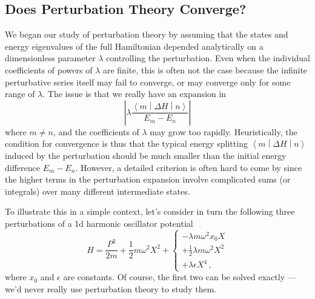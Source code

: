 \documentclass{article}
\theoremstyle{plain}\theoremheaderfont{\normalfont\itshape}\theorembodyfont{\rmfamily}\theoremseparator{.}\newtheorem*{rem}{Remark}\newtheorem*{ex}{Example}\newtheorem*{proof}{Proof}\newtheorem*{altp}{Alternative proof}
\theoremstyle{plain}\theoremheaderfont{\normalfont\bfseries}\theorembodyfont{\rmfamily}\theoremseparator{.}\newtheorem{thm}{Theorem}[section]\newtheorem{lem}[thm]{Lemma}\newtheorem{prop}[thm]{Proposition}\newtheorem*{cor}{Corollary}\newtheorem{defn}[thm]{Definition}\newtheorem{clm}[thm]{Claim}\newtheorem{clminproof}{Claim}
\theoremstyle{break}\theoremheaderfont{\normalfont\itshape}\theorembodyfont{\rmfamily}\theoremseparator{.\medskip}\newtheorem*{proofskip}{Proof}\newtheorem*{exs}{Examples}\newtheorem*{rems}{Remarks}
\theoremstyle{break}\theoremheaderfont{\normalfont\bfseries}\theorembodyfont{\rmfamily}\theoremseparator{.\medskip}\newtheorem{lemskip}[thm]{Lemma}\newtheorem{defnskip}[thm]{Definition}\newtheorem{propskip}[thm]{Proposition}\newtheorem{thmskip}[thm]{Theorem}
\numberwithin{equation}{section}
\newcommand{\mel}[3]{\left\langle #1 \middle| #2 \middle| #3 \right\rangle}
\newcommand{\abs}[1]{\left| #1 \right|}
\begin{document}
    \subsection{Does Perturbation Theory Converge?}
    We began our study of perturbation theory by assuming that the states and energy eigenvalues of the full Hamiltonian depended analytically on a dimensionless parameter \(\lambda\) controlling the perturbation. Even when the individual coefficients of powers of \(\lambda\) are finite, this is often not the case because the infinite perturbative series itself may fail to converge, or may converge only for some range of \(\lambda\). The issue is that we really have an expansion in
    \begin{equation}
        \abs{\lambda\frac{\mel{m}{\Delta H}{n}}{E_m-E_n}}
    \end{equation}
    where \(m\ne n\), and the coefficients of \(\lambda\) may grow too rapidly. Heuristically, the condition for convergence is thus that the typical energy splitting \(\mel{m}{\Delta H}{n}\) induced by the perturbation should be much smaller than the initial energy difference \(E_m-E_n\). However, a detailed criterion is often hard to come by since the higher terms in the perturbation expansion involve complicated sums (or integrals) over many different intermediate states.

    To illustrate this in a simple context, let's consider in turn the following three perturbations of a 1d harmonic oscillator potential
    \begin{equation}
        H=\frac{P^2}{2m}+\frac{1}{2}m\omega^2X^2+\begin{cases}
            -\lambda m\omega^2 x_0X\\
            +\frac{1}{2}\lambda m\omega^2X^2\\
            +\lambda\epsilon X^4\,,
        \end{cases}
    \end{equation}
    where \(x_0\) and \(\epsilon\) are constants. Of course, the first two can be solved exactly --- we'd never really use perturbation theory to study them.
\end{document}
